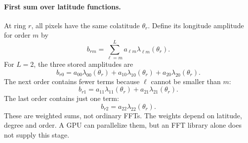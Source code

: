 \paragraph{First sum over latitude functions.}
At ring $r$, all pixels have the same colatitude $\theta_r$. Define its
longitude amplitude for order $m$ by
\begin{equation}
 b_{rm}=\sum_{\ell=m}^{L}a_{\ell m}\lambda_{\ell m}(\theta_r).
\end{equation}
For $L=2$, the three stored amplitudes are
\begin{equation}
 b_{r0}=a_{00}\lambda_{00}(\theta_r)
       +a_{10}\lambda_{10}(\theta_r)+a_{20}\lambda_{20}(\theta_r).
\end{equation}
The next order contains fewer terms because $\ell$ cannot be smaller than $m$:
\begin{equation}
 b_{r1}=a_{11}\lambda_{11}(\theta_r)+a_{21}\lambda_{21}(\theta_r).
\end{equation}
The last order contains just one term:
\begin{equation}
 b_{r2}=a_{22}\lambda_{22}(\theta_r).
\end{equation}
These are weighted sums, not ordinary FFTs. The weights depend on latitude,
degree and order. A GPU can parallelize them, but an FFT library alone does
not supply this stage.

